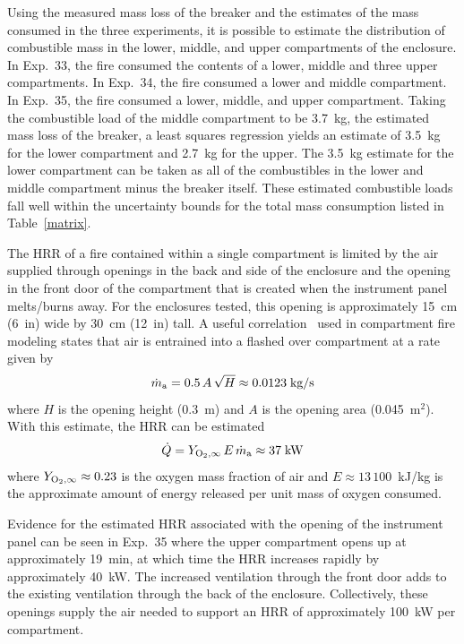 Using the measured mass loss of the breaker and the estimates of the mass consumed in the three experiments, it is possible to estimate the distribution of combustible mass in the lower, middle, and upper compartments of the enclosure. In Exp.~33, the fire consumed the contents of a lower, middle and three upper compartments. In Exp.~34, the fire consumed a lower and middle compartment. In Exp.~35, the fire consumed a lower, middle, and upper compartment. Taking the combustible load of the middle compartment to be 3.7~kg, the estimated mass loss of the breaker, a least squares regression yields an estimate of 3.5~kg for the lower compartment and 2.7~kg for the upper. The 3.5~kg estimate for the lower compartment can be taken as all of the combustibles in the lower and middle compartment minus the breaker itself. These estimated combustible loads fall well within the uncertainty bounds for the total mass consumption listed in Table~\ref{matrix}.

The HRR of a fire contained within a single compartment is limited by the air supplied through openings in the back and side of the enclosure and the opening in the front door of the compartment that is created when the instrument panel melts/burns away. For the enclosures tested, this opening is approximately 15~cm (6~in) wide by 30~cm (12~in) tall. A useful correlation~\cite{SFPE:Walton} used in compartment fire modeling states that air is entrained into a flashed over compartment at a rate given by
\begin{equation}
   \dot{m}_{\rm a} = 0.5  \, A \, \sqrt{H}  \approx 0.0123 \; \hbox{kg/s}
\end{equation}
where $H$ is the opening height (0.3~m) and $A$ is the opening area (0.045~m$^2$). With this estimate, the HRR can be estimated
\begin{equation}
   \dot{Q} = Y_{\rm O_2,\infty} \, E \, \dot{m}_{\rm a} \approx 37 \; \hbox{kW}
\end{equation}
where $Y_{\rm O_2,\infty}\approx 0.23$ is the oxygen mass fraction of air and $E\approx 13\,100$~kJ/kg is the approximate amount of energy released per unit mass of oxygen consumed.

Evidence for the estimated HRR associated with the opening of the instrument panel can be seen in Exp.~35 where the upper compartment opens up at approximately 19~min, at which time the HRR increases rapidly by approximately 40~kW. The increased ventilation through the front door adds to the existing ventilation through the back of the enclosure. Collectively, these openings supply the air needed to support an HRR of approximately 100~kW per compartment.




